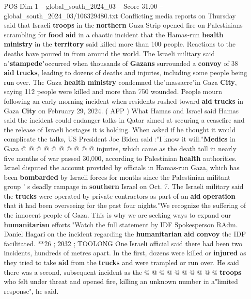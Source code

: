 \begin{textsample}{POS Dim 1 – global\_south\_2024\_03 – Score 31.00 – global\_south\_2024\_03/106329480.txt}  \label{ex:f1_pos_014}
Conflicting media reports on Thursday said that Israeli \textbf{troops} in the \textbf{northern} Gaza Strip opened fire on Palestinians scrambling for \textbf{food} \textbf{aid} in a chaotic incident that the Hamas-run \textbf{health} \textbf{ministry} in the \textbf{territory} said killed more than 100 people.
Reactions to the deaths have poured in from around the world.
The Israeli military said a"\textbf{stampede}"occurred when thousands of \textbf{Gazans} surrounded a \textbf{convoy} of 38 \textbf{aid} \textbf{trucks}, leading to dozens of deaths and injuries, including some people being run over.
The Gaza \textbf{health} \textbf{ministry} condemned the"massacre"in Gaza \textbf{City}, saying 112 people were killed and more than 750 wounded.
People mourn following an early morning incident when residents rushed toward \textbf{aid} \textbf{trucks} in Gaza \textbf{City} on February 29, 2024. ( AFP ) What Hamas and Israel said Hamas said the incident could endanger talks in Qatar aimed at securing a ceasefire and the release of Israeli hostages it is holding.
When asked if he thought it would complicate the talks, US President Joe Biden said :"I know it will."\textbf{Medics} in Gaza @ @ @ @ @ @ @ @ @ @ injuries, which came as the death toll in nearly five months of war passed 30,000, according to Palestinian \textbf{health} authorities.
Israel disputed the account provided by officials in Hamas-run Gaza, which has been \textbf{bombarded} by Israeli forces for months since the Palestinian militant group ' s deadly rampage in \textbf{southern} Israel on Oct. 7.
The Israeli military said the \textbf{trucks} were operated by private contractors as part of an \textbf{aid} \textbf{operation} that it had been overseeing for the past four nights."We recognize the suffering of the innocent people of Gaza.
This is why we are seeking ways to expand our \textbf{humanitarian} efforts."Watch the full statement by IDF Spokesperson RAdm.
Daniel Hagari on the incident regarding the \textbf{humanitarian} \textbf{aid} \textbf{convoy} the IDF facilitated. **26 ; 2032 ; TOOLONG One Israeli official said there had been two incidents, hundreds of metres apart.
In the first, dozens were killed or \textbf{injured} as they tried to take \textbf{aid} from the \textbf{trucks} and were trampled or run over.
He said there was a second, subsequent incident as the @ @ @ @ @ @ @ @ @ @ \textbf{troops} who felt under threat and opened fire, killing an unknown number in a"limited response", he said.

\end{textsample}
